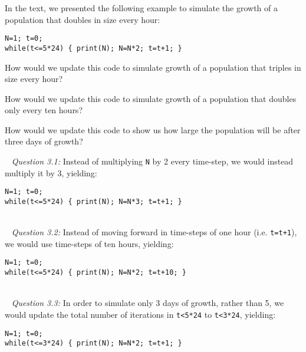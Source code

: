 \documentclass[12pt]{article}
\begin{document}
\date{}
\maketitle
In the text, we presented the following example to simulate the growth of a population that doubles in size every hour:

\begin{verbatim}
N=1; t=0;
while(t<=5*24) { print(N); N=N*2; t=t+1; }
\end{verbatim}

\newline
How would we update this code to simulate growth of a population that triples in size every hour?
\newline

\newline
How would we update this code to simulate growth of a population that doubles only every ten hours?
\newline

\newline
How would we update this code to show us how large the population will be after three days of growth?

\pagebreak
{}

~\newline
\textit{Question 3.1:}
\newline
Instead of multiplying \verb!N! by 2 every time-step, we would instead multiply it by 3, yielding:

\begin{verbatim}
N=1; t=0;
while(t<=5*24) { print(N); N=N*3; t=t+1; }
\end{verbatim}

~\\~\newline
\textit{Question 3.2:}
\newline
Instead of moving forward in time-steps of one hour (i.e. \verb!t=t+1!), we would use time-steps of ten hours, yielding:

\begin{verbatim}
N=1; t=0;
while(t<=5*24) { print(N); N=N*2; t=t+10; }
\end{verbatim}

~\\~\newline
\textit{Question 3.3:}
\newline
In order to simulate only 3 days of growth, rather than 5, we would update the total number of iterations in \verb!t<5*24! to \verb!t<3*24!, yielding:

\begin{verbatim}
N=1; t=0;
while(t<=3*24) { print(N); N=N*2; t=t+1; }
\end{verbatim}
\end{document}
